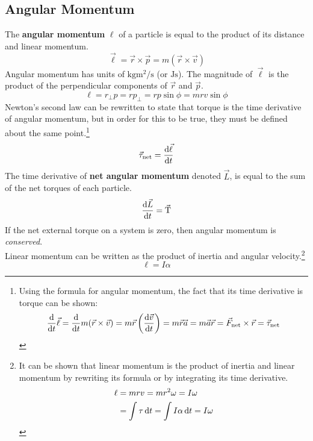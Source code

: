 \documentclass[../AP_Physics_C.tex]{subfiles}
\begin{document}
		\subsection{Angular Momentum}
			The \textbf{angular momentum} $\pmb{\ell}$ of a particle is equal to the product of its distance and linear momentum.
			\[\vec{\ell} = \vec{r} \times \vec{p} = m(\vec{r} \times \vec{v})\]
			Angular momentum has units of $\mathrm{kgm^2/s}$ (or $\mathrm{Js}$).
			The magnitude of $\vec{\ell}$ is the product of the perpendicular components of $\vec{r}$ and $\vec{p}$.
			\[\ell = r_\bot p = rp_\bot = rp\sin\phi = mrv\sin\phi\]
			Newton's second law can be rewritten to state that torque is the time derivative of angular momentum, but in order for this to be true, they must be defined about the same point.\footnote{
				Using the formula for angular momentum, the fact that its time derivative is torque can be shown:
				\[\frac{\mathrm{d}}{\mathrm{d} t}\vec{\ell} = \frac{\mathrm{d}}{\mathrm{d} t}m(\vec{r}\times\vec{v}) = m\vec{r}\left(\frac{\mathrm{d}\vec{v}}{\mathrm{d} t}\right) = m\vec{r}\vec{a} = m\vec{a}\vec{r} = \vec{F}_{\mathrm{net}}\times\vec{r} = \vec{\tau}_{\mathrm{net}}\]
			}
			\[\vec{\tau}_{\mathrm{net}} = \frac{\mathrm{d} \vec{\ell}}{\mathrm{d} t}\]
			The time derivative of \textbf{net angular momentum} denoted $\vec{L}$, is equal to the sum of the net torques of each particle.
			\[\frac{\mathrm{d}\vec{L}}{\mathrm{d} t} = \vec{\operatorname{T}}\]
			If the net external torque on a system is zero, then angular momentum is \emph{conserved}. \\
			Linear momentum can be written as the product of inertia and angular velocity.\footnote{It can be shown that linear momentum is the product of inertia and linear momentum by rewriting its formula or by integrating its time derivative.\begin{align*}\ell &= mrv = mr^2\omega = I\omega \\ &= \int \tau\,\mathrm{d} t = \int I\alpha\,\mathrm{d} t = I\omega\end{align*}}
			\[\ell = I\alpha\]
\end{document}
